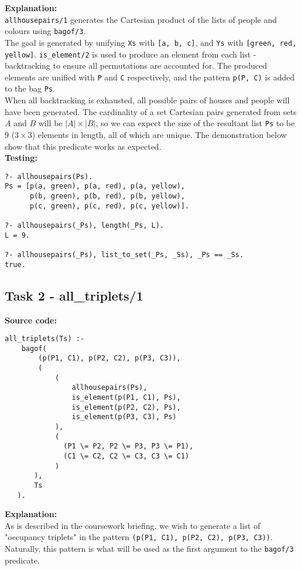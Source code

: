 \documentclass[11pt]{article}
\begin{document}
\textbf{Explanation:} \\
{\verb|allhousepairs/1|} generates the Cartesian product of the lists of people and colours using {\verb|bagof/3|}. \\

The goal is generated by unifying {\verb|Xs|} with {\verb|[a, b, c]|}, and {\verb|Ys|} with {\verb|[green, red, yellow]|}. {\verb|is_element/2|} is used to produce an element from each list - backtracking to ensure all permutations are accounted for. The produced elements are unified with {\verb|P|} and {\verb|C|} respectively, and the pattern {\verb|p(P, C)|} is added to the bag {\verb|Ps|}. \\

When all backtracking is exhausted, all possible pairs of houses and people will have been generated. The cardinality of a set Cartesian pairs generated from sets $A$ and $B$ will be $|A| \times |B|$, so we can expect the size of the resultant list {\verb|Ps|} to be 9 ($3 \times 3$) elements in length, all of which are unique. The demonstration below show that this predicate works as expected. \\


\textbf{Testing:}
\begin{verbatim}
?- allhousepairs(Ps).
Ps = [p(a, green), p(a, red), p(a, yellow), 
      p(b, green), p(b, red), p(b, yellow), 
      p(c, green), p(c, red), p(c, yellow)].

?- allhousepairs(_Ps), length(_Ps, L).
L = 9.

?- allhousepairs(_Ps), list_to_set(_Ps, _Ss), _Ps == _Ss.
true.
\end{verbatim}
\newpage

\subsection{Task 2 - all\_triplets/1}
\textbf{Source code:}
\begin{verbatim}
all_triplets(Ts) :-
    bagof(
        (p(P1, C1), p(P2, C2), p(P3, C3)),
        (
            (
                allhousepairs(Ps),
                is_element(p(P1, C1), Ps), 
                is_element(p(P2, C2), Ps),
                is_element(p(P3, C3), Ps)  
            ),
            (
              (P1 \= P2, P2 \= P3, P3 \= P1),
              (C1 \= C2, C2 \= C3, C3 \= C1)
            )
       ),
       Ts
   ).
\end{verbatim}

\textbf{Explanation:} \\
As is described in the coursework briefing, we wish to generate a list of "occupancy triplets" in the pattern {\verb|(p(P1, C1), p(P2, C2), p(P3, C3))|}. Naturally, this pattern is what will be used as the first argument to the {\verb|bagof/3|} predicate. \\
\end{document}
